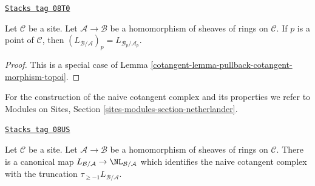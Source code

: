 \begin{lemma}
\label{cotangent-lemma-stalk-cotangent-complex}
\href{https://stacks.math.columbia.edu/tag/08T0}{\texttt{Stacks tag 08T0}}

Let $\mathcal{C}$ be a site. Let $\mathcal{A} \to \mathcal{B}$ be a
homomorphism of sheaves of rings on $\mathcal{C}$. If $p$ is a point
of $\mathcal{C}$, then
$(L_{\mathcal{B}/\mathcal{A}})_p = L_{\mathcal{B}_p/\mathcal{A}_p}$.
\end{lemma}

\begin{proof}

This is a special case of Lemma \ref{cotangent-lemma-pullback-cotangent-morphism-topoi}.
\end{proof}

For the construction of the naive cotangent complex and its properties
we refer to
Modules on Sites, Section \ref{sites-modules-section-netherlander}.

\begin{lemma}
\label{cotangent-lemma-compare-cotangent-complex-with-naive}
\href{https://stacks.math.columbia.edu/tag/08US}{\texttt{Stacks tag 08US}}

Let $\mathcal{C}$ be a site. Let $\mathcal{A} \to \mathcal{B}$ be a
homomorphism of sheaves of rings on $\mathcal{C}$.
There is a canonical map
$L_{\mathcal{B}/\mathcal{A}} \to \NL_{\mathcal{B}/\mathcal{A}}$
which identifies the naive cotangent complex with the truncation
$\tau_{\geq -1}L_{\mathcal{B}/\mathcal{A}}$.
\end{lemma}

